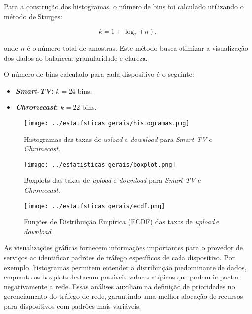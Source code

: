Para a construção dos histogramas, o número de bins foi calculado utilizando o método de Sturges:

\begin{equation}\label{eq:sturges}
k = 1 + \log_2(n),
\end{equation}

onde \(n\) é o número total de amostras. Este método busca otimizar a visualização dos dados ao balancear granularidade e clareza.

O número de bins calculado para cada dispositivo é o seguinte:
\begin{itemize}
    \item \textbf{\textit{Smart-TV}:} \(k = 24\) bins.
    \item \textbf{\textit{Chromecast}:} \(k = 22\) bins.
\end{itemize}

\begin{figure}[H]
    \centering
    \texttt{[image: ../estatísticas gerais/histogramas.png]}
    \caption{Histogramas das taxas de \textit{upload} e \textit{download} para \textit{Smart-TV} e \textit{Chromecast}.}
    \label{fig:histogramas}
\end{figure}

\begin{figure}[H]
    \centering
    \texttt{[image: ../estatísticas gerais/boxplot.png]}
    \caption{Boxplots das taxas de \textit{upload} e \textit{download} para \textit{Smart-TV} e \textit{Chromecast}.}
    \label{fig:boxplots}
\end{figure}

\begin{figure}[H]
    \centering
    \texttt{[image: ../estatísticas gerais/ecdf.png]}
    \caption{Funções de Distribuição Empírica (ECDF) das taxas de \textit{upload} e \textit{download}.}
    \label{fig:ecdf}
\end{figure}

As visualizações gráficas fornecem informações importantes para o provedor de serviços ao identificar padrões de tráfego específicos de cada dispositivo. Por exemplo, histogramas permitem entender a distribuição predominante de dados, enquanto os boxplots destacam possíveis valores atípicos que podem impactar negativamente a rede. Essas análises auxiliam na definição de prioridades no gerenciamento do tráfego de rede, garantindo uma melhor alocação de recursos para dispositivos com padrões mais variáveis.

